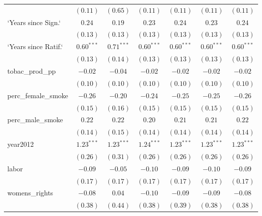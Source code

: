 \begin{table}[!h]
\begin{center}
\begin{tabular}{l c c c c c c }
                        & $(0.11)$     & $(0.65)$     & $(0.11)$     & $(0.11)$     & $(0.11)$     & $(0.11)$     \\
`Years since Sign.`     & $0.24$       & $0.19$       & $0.23$       & $0.24$       & $0.23$       & $0.24$       \\
                        & $(0.13)$     & $(0.13)$     & $(0.13)$     & $(0.13)$     & $(0.13)$     & $(0.13)$     \\
`Years since Ratif.`    & $0.60^{***}$ & $0.71^{***}$ & $0.60^{***}$ & $0.60^{***}$ & $0.60^{***}$ & $0.60^{***}$ \\
                        & $(0.13)$     & $(0.14)$     & $(0.13)$     & $(0.13)$     & $(0.13)$     & $(0.13)$     \\
tobac\_prod\_pp         & $-0.02$      & $-0.04$      & $-0.02$      & $-0.02$      & $-0.02$      & $-0.02$      \\
                        & $(0.10)$     & $(0.10)$     & $(0.10)$     & $(0.10)$     & $(0.10)$     & $(0.10)$     \\
perc\_female\_smoke     & $-0.26$      & $-0.20$      & $-0.24$      & $-0.25$      & $-0.25$      & $-0.26$      \\
                        & $(0.15)$     & $(0.16)$     & $(0.15)$     & $(0.15)$     & $(0.15)$     & $(0.15)$     \\
perc\_male\_smoke       & $0.22$       & $0.22$       & $0.20$       & $0.21$       & $0.21$       & $0.22$       \\
                        & $(0.14)$     & $(0.15)$     & $(0.14)$     & $(0.14)$     & $(0.14)$     & $(0.14)$     \\
year2012                & $1.23^{***}$ & $1.23^{***}$ & $1.24^{***}$ & $1.23^{***}$ & $1.23^{***}$ & $1.23^{***}$ \\
                        & $(0.26)$     & $(0.31)$     & $(0.26)$     & $(0.26)$     & $(0.26)$     & $(0.26)$     \\
labor                   & $-0.09$      & $-0.05$      & $-0.10$      & $-0.09$      & $-0.10$      & $-0.09$      \\
                        & $(0.17)$     & $(0.17)$     & $(0.17)$     & $(0.17)$     & $(0.17)$     & $(0.17)$     \\
womens\_rights          & $-0.08$      & $0.04$       & $-0.10$      & $-0.09$      & $-0.09$      & $-0.08$      \\
                        & $(0.38)$     & $(0.44)$     & $(0.38)$     & $(0.39)$     & $(0.38)$     & $(0.38)$     \\

\end{tabular}
\end{center}
\end{table}
